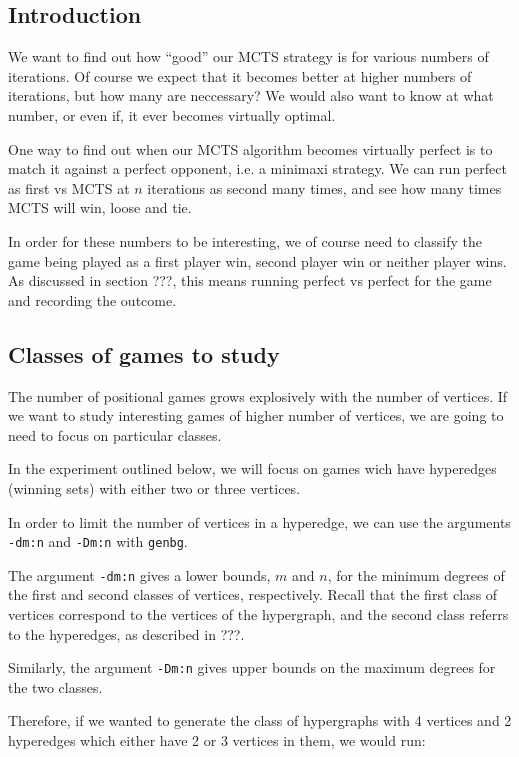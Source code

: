 \subsection{Introduction}


We want to find out how ``good'' our MCTS strategy is for various numbers of iterations.
Of course we expect that it becomes better at higher numbers of iterations, but how many are neccessary?
We would also want to know at what number, or even if, it ever becomes virtually optimal.


One way to find out when our MCTS algorithm becomes virtually perfect is to match it against a perfect opponent, i.e. a minimaxi strategy.
We can run perfect as first vs MCTS at $n$ iterations as second many times, and see how many times MCTS will win, loose and tie.

In order for these numbers to be interesting, we of course need to classify the game being played as a first player win, second player win or neither player wins.
As discussed in section ???, this means running perfect vs perfect for the game and recording the outcome.


\subsection{Classes of games to study}

The number of positional games grows explosively with the number of vertices.
If we want to study interesting games of higher number of vertices, we are going to need to focus on particular classes.

In the experiment outlined below, we will focus on games wich have hyperedges (winning sets) with either two or three vertices.

In order to limit the number of vertices in a hyperedge, we can use the arguments \texttt{-dm:n} and \texttt{-Dm:n} with \texttt{genbg}.

The argument \texttt{-dm:n} gives a lower bounds, $m$ and $n$, for the minimum degrees of the first and second classes of vertices, respectively.
Recall that the first class of vertices correspond to the vertices of the hypergraph, and the second class referrs to the hyperedges, as described in ???.

Similarly, the argument \texttt{-Dm:n} gives upper bounds on the maximum degrees for the two classes.

Therefore, if we wanted to generate the class of hypergraphs with 4 vertices and 2 hyperedges which either have 2 or 3 vertices in them, we would run:

